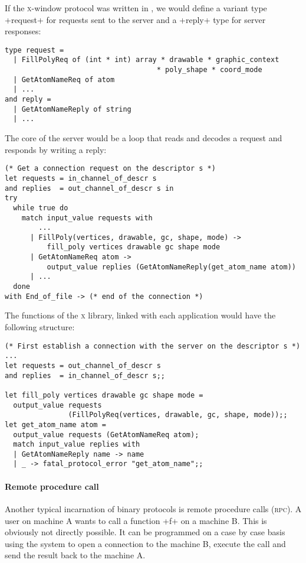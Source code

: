 \begin{example}
If the \textsc{x}-window protocol was written in {\ocaml}, we would
define a variant type \ml+request+ for requests sent to the
server and a \ml+reply+ type for server responses:
%
\begin{lstlisting}
type request =
  | FillPolyReq of (int * int) array * drawable * graphic_context
                                    * poly_shape * coord_mode
  | GetAtomNameReq of atom
  | ...
and reply =
  | GetAtomNameReply of string
  | ...
\end{lstlisting}
%
The core of the server would be a loop that reads and decodes a
request and responds by writing a reply:
%
\begin{lstlisting}
(* Get a connection request on the descriptor s *)
let requests = in_channel_of_descr s
and replies  = out_channel_of_descr s in
try
  while true do
    match input_value requests with
        ...
      | FillPoly(vertices, drawable, gc, shape, mode) ->
          fill_poly vertices drawable gc shape mode
      | GetAtomNameReq atom ->
          output_value replies (GetAtomNameReply(get_atom_name atom))
      | ...
  done
with End_of_file -> (* end of the connection *)
\end{lstlisting}
%
The functions of the \textsc{x} library, 
linked with each application would have the following structure:
%
\begin{lstlisting}
(* First establish a connection with the server on the descriptor s *)
...
let requests = out_channel_of_descr s
and replies  = in_channel_of_descr s;;

let fill_poly vertices drawable gc shape mode =
  output_value requests
               (FillPolyReq(vertices, drawable, gc, shape, mode));;
let get_atom_name atom =
  output_value requests (GetAtomNameReq atom);
  match input_value replies with
  | GetAtomNameReply name -> name
  | _ -> fatal_protocol_error "get_atom_name";;
\end{lstlisting}
\end{example}


\paragraph{Remote procedure call}

Another typical incarnation of binary protocols is remote procedure
calls (\textsc{rpc}). A user on machine A wants to call a function
\ml+f+ on a machine B. This is obviously not directly possible. It can
be programmed on a case by case basis using the system to open
a connection to the machine B, execute the call and send the
result back to the machine A.

